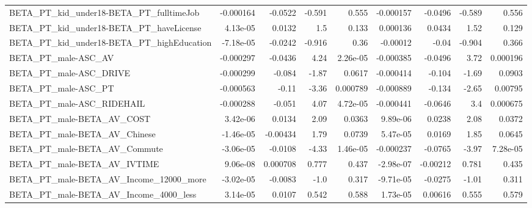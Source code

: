 \begin{tabular}{lrrrrrrrr}
BETA\_PT\_kid\_under18-BETA\_PT\_fulltimeJob            &   -0.000164 &      -0.0522 &   -0.591 &    0.555 &  -0.000157 &     -0.0496 &       -0.589 &         0.556 \\
BETA\_PT\_kid\_under18-BETA\_PT\_haveLicense            &    4.13e-05 &       0.0132 &      1.5 &    0.133 &   0.000136 &      0.0434 &         1.52 &         0.129 \\
BETA\_PT\_kid\_under18-BETA\_PT\_highEducation          &   -7.18e-05 &      -0.0242 &   -0.916 &     0.36 &   -0.00012 &       -0.04 &       -0.904 &         0.366 \\
BETA\_PT\_male-ASC\_AV                                &   -0.000297 &      -0.0436 &     4.24 & 2.26e-05 &  -0.000385 &     -0.0496 &         3.72 &      0.000196 \\
BETA\_PT\_male-ASC\_DRIVE                             &   -0.000299 &       -0.084 &    -1.87 &   0.0617 &  -0.000414 &      -0.104 &        -1.69 &        0.0903 \\
BETA\_PT\_male-ASC\_PT                                &   -0.000563 &        -0.11 &    -3.36 & 0.000789 &  -0.000889 &      -0.134 &        -2.65 &       0.00795 \\
BETA\_PT\_male-ASC\_RIDEHAIL                          &   -0.000288 &       -0.051 &     4.07 & 4.72e-05 &  -0.000441 &     -0.0646 &          3.4 &      0.000675 \\
BETA\_PT\_male-BETA\_AV\_COST                          &    3.42e-06 &       0.0134 &     2.09 &   0.0363 &   9.89e-06 &      0.0238 &         2.08 &        0.0372 \\
BETA\_PT\_male-BETA\_AV\_Chinese                       &   -1.46e-05 &     -0.00434 &     1.79 &   0.0739 &   5.47e-05 &      0.0169 &         1.85 &        0.0645 \\
BETA\_PT\_male-BETA\_AV\_Commute                       &   -3.06e-05 &      -0.0108 &    -4.33 & 1.46e-05 &  -0.000237 &     -0.0765 &        -3.97 &      7.28e-05 \\
BETA\_PT\_male-BETA\_AV\_IVTIME                        &    9.06e-08 &     0.000708 &    0.777 &    0.437 &  -2.98e-07 &    -0.00212 &        0.781 &         0.435 \\
BETA\_PT\_male-BETA\_AV\_Income\_12000\_more             &   -3.02e-05 &      -0.0083 &     -1.0 &    0.317 &  -9.71e-05 &     -0.0275 &        -1.01 &         0.311 \\
BETA\_PT\_male-BETA\_AV\_Income\_4000\_less              &    3.14e-05 &       0.0107 &    0.542 &    0.588 &   1.73e-05 &     0.00616 &        0.555 &         0.579 \\

\end{tabular}
